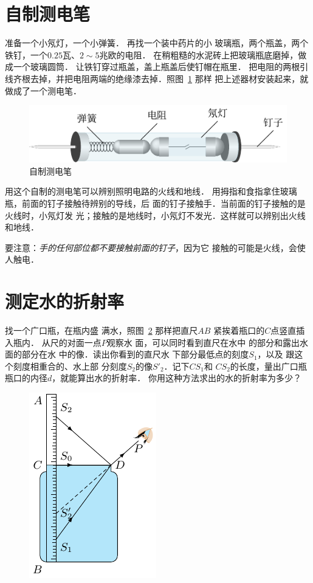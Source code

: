 \section{自制测电笔}
准备一个小氖灯，一个小弹簧．
再找一个装中药片的小
玻璃瓶，两个瓶盖，两个铁钉，一个$0.25$瓦、$2 \sim 5$兆欧的电阻．
在稍粗糙的水泥砖上把玻璃瓶底磨掉，做成一个玻璃圆筒．
让铁钉穿过瓶盖，盖上瓶盖后使钉帽在瓶里．
把电阻的两根引
线齐根去掉，并把电阻两端的绝缘漆去掉．照图~\ref{fig_C_10-13} 那样
把上述器材安装起来，就做成了一个测电笔．
\begin{figure}[htbp]
    \centering
    \includegraphics{fig/C/10-13.pdf}
    \caption{自制测电笔}\label{fig_C_10-13}
\end{figure}

用这个自制的测电笔可以辨别照明电路的火线和地线．
用拇指和食指拿住玻璃瓶，前面的钉子接触待辨别的导线，后
面的钉子接触手．当前面的钉子接触的是火线时，小氖灯发
光；接触的是地线时，小氖灯不发光．这样就可以辨别出火线
和地线．

要注意：\textit{手的任何部位都不要接触前面的钉子}，因为它
接触的可能是火线，会使人触电．

\section{测定水的折射率}
找一个广口瓶，在瓶内盛
满水，照图~\ref{fig_C_10-14} 那样把直尺$AB$
紧挨着瓶口的$C$点竖直插入瓶内．
从尺的对面一点$P$观察水
面，可以同时看到直尺在水中
的部分和露出水面的部分在水
中的像．读出你看到的直尺水
下部分最低点的刻度$S_1$，以及
跟这个刻度相重合的、水上部
分刻度$S_2$的像$S'_2$．记下$CS_1$和
$CS_2$的长度，量出广口瓶瓶口的内径$d$，就能算出水的折射率．
你用这种方法求出的水的折射率为多少？
\begin{figure}[htbp]
	\centering
	\includegraphics{fig/C/10-14.pdf}
	\caption{}\label{fig_C_10-14}
\end{figure} 

